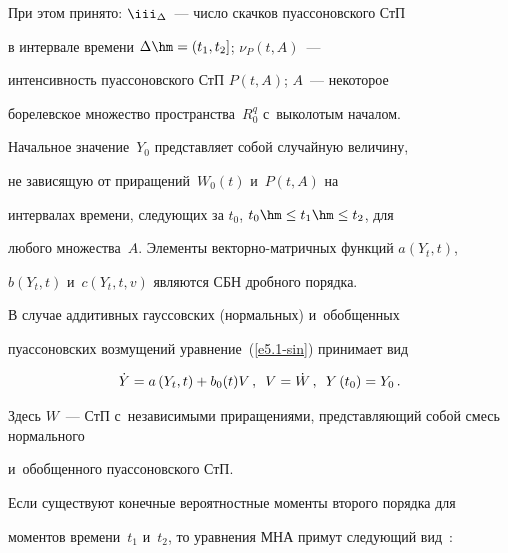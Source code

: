 При этом принято: $\iii_{\Delta}$~--- число скачков пуассоновского СтП

в интервале времени  $\Delta \hm= (t_1, t_2]$; $\nu_P (t, A)$~---

интенсивность пуассоновского СтП  $P(t,A)$; $A$~--- некоторое

борелевское множество пространства~$R_0^q$ с~выколотым началом.

Начальное значение~$Y_0$ представляет собой случайную величину, 

не зависящую от приращений~$W_0(t)$ и~$P(t,A)$ на

интервалах времени, следующих за  $t_0$, $t_0 \hm\le t_1\hm\le t_2$, для

любого множества~$A$. Элементы век\-тор\-но-мат\-рич\-ных функций $a(Y_t,t)$, 

$b(Y_t,t)$ и~$c(Y_t,t,v)$ являются СБН дробного порядка.





В случае аддитивных гауссовских (нормальных) и~обобщенных 

пуассоновских возмущений уравнение~(\ref{e5.1-sin}) принимает  вид~\cite{1-sin, 5-sin, 7-sin}

     \begin{equation}

     \dot Y = a\left(Y_t,t\right)+ b_0 (t) V\,, \enskip 

     V = \dot W\,,\enskip Y\left(t_0\right) = Y_0\,.

     \label{e5.2-sin}

     \end{equation}

Здесь $W$~--- СтП с~независимыми приращениями, представляющий собой смесь нормального 

и~обобщенного пуассоновского СтП.



Если существуют конечные вероятностные моменты второго порядка для 

моментов времени~$t_1$ и~$t_2$, то уравнения МНА примут следующий вид~\cite{1-sin, 6-sin, 7-sin}:

